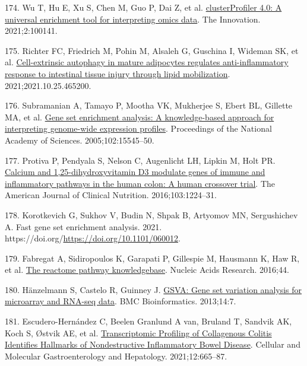 \documentclass[
  12pt,
  a4paper,
  twoside,
  openright]{book}
\newlength{\cslhangindent}
\newlength{\cslentryspacingunit} %
\newenvironment{CSLReferences}[2] %
 {%
  \setlength{\parindent}{0pt}
  \ifodd #1
  \let\oldpar\par
  \def\par{\hangindent=\cslhangindent\oldpar}
  \fi
  \setlength{\parskip}{#2\cslentryspacingunit}
 }%
 {}
\begin{document}
\begin{CSLReferences}{0}{0}
\leavevmode{}%
174. Wu T, Hu E, Xu S, Chen M, Guo P, Dai Z, et al. \href{https://doi.org/10.1016/j.xinn.2021.100141}{clusterProfiler 4.0: A universal enrichment tool for interpreting omics data}. The Innovation. 2021;2:100141.

\leavevmode{}%
175. Richter FC, Friedrich M, Pohin M, Alsaleh G, Guschina I, Wideman SK, et al. \href{https://doi.org/10.1101/2021.10.25.465200}{Cell-extrinsic autophagy in mature adipocytes regulates anti-inflammatory response to intestinal tissue injury through lipid mobilization}. 2021;2021.10.25.465200.

\leavevmode{}%
176. Subramanian A, Tamayo P, Mootha VK, Mukherjee S, Ebert BL, Gillette MA, et al. \href{https://doi.org/10.1073/pnas.0506580102}{Gene set enrichment analysis: A knowledge-based approach for interpreting genome-wide expression profiles}. Proceedings of the National Academy of Sciences. 2005;102:15545--50.

\leavevmode{}%
177. Protiva P, Pendyala S, Nelson C, Augenlicht LH, Lipkin M, Holt PR. \href{https://doi.org/10.3945/ajcn.114.105304}{Calcium and 1,25-dihydroxyvitamin D3 modulate genes of immune and inflammatory pathways in the human colon: A human crossover trial}. The American Journal of Clinical Nutrition. 2016;103:1224--31.

\leavevmode{}%
178. Korotkevich G, Sukhov V, Budin N, Shpak B, Artyomov MN, Sergushichev A. Fast gene set enrichment analysis. 2021. https://doi.org/\url{https://doi.org/10.1101/060012}.

\leavevmode{}%
179. Fabregat A, Sidiropoulos K, Garapati P, Gillespie M, Hausmann K, Haw R, et al. \href{https://doi.org/10.1093/nar/gkv1351}{The reactome pathway knowledgebase}. Nucleic Acids Research. 2016;44.

\leavevmode{}%
180. Hänzelmann S, Castelo R, Guinney J. \href{https://doi.org/10.1186/1471-2105-14-7}{GSVA: Gene set variation analysis for microarray and RNA-seq data}. BMC Bioinformatics. 2013;14:7.

\leavevmode{}%
181. Escudero-Hernández C, Beelen Granlund A van, Bruland T, Sandvik AK, Koch S, Østvik AE, et al. \href{https://doi.org/10.1016/j.jcmgh.2021.04.011}{Transcriptomic Profiling of Collagenous Colitis Identifies Hallmarks of Nondestructive Inflammatory Bowel Disease}. Cellular and Molecular Gastroenterology and Hepatology. 2021;12:665--87.


\end{CSLReferences}
\end{document}
